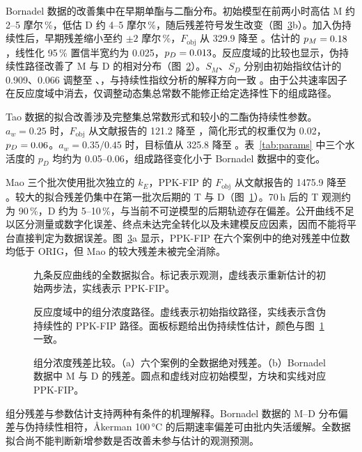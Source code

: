 Bornadel 数据的改善集中在早期单酯与二酯分布。初始模型在前两小时高估 M 约 2--5 摩尔\,\%，低估 D 约 4--5 摩尔\,\%，随后残差符号发生改变（图~\ref{fig:resid}b）。加入伪持续性后，早期残差缩小至约 $\pm2$ 摩尔\,\%，$F_\mathrm{obj}$ 从 329.9 降至 \InBornFnew。估计的 $p_M=0.18$，线性化 95\,\% 置信半宽约为 0.025，$p_D=0.013$。反应度域的比较也显示，伪持续性路径改善了 M 与 D 的相对分布（图~\ref{fig:paths}）。$S_M$、$S_D$ 分别由初始指纹估计的 0.909、0.066 调整至 \BornSM、\BornSD，与持续性指纹分析的解释方向一致 \cite{mitchell2023}。由于公共速率因子在反应度域中消去，仅调整动态集总常数不能修正给定选择性下的组成路径。

Tao 数据的拟合改善涉及完整集总常数形式和较小的二酯伪持续性参数。$a_w=0.25$ 时，$F_\mathrm{obj}$ 从文献报告的 121.2 降至 \InTaoAFnew，简化形式的权重仅为 0.02，$p_D=0.06$。$a_w=0.35/0.45$ 时，目标值从 325.8 降至 \InTaoBFnew。表~\ref{tab:params} 中三个水活度的 $p_D$ 均约为 0.05--0.06，组成路径变化小于 Bornadel 数据中的变化。

Mao 三个批次使用批次独立的 $k_E$，PPK-FIP 的 $F_\mathrm{obj}$ 从文献报告的 1475.9 降至 \InMaoFnew。较大的拟合残差仍集中在第一批次后期的 T 与 D（图~\ref{fig:fits}）。70\,h 后的 T 观测约为 90\,\%，D 约为 5--10\,\%，与当前不可逆模型的后期轨迹存在偏差。公开曲线不足以区分测量或数字化误差、终点未达完全转化以及未建模反应因素，因而不能将平台直接判定为数据误差。图~\ref{fig:resid}a 显示，PPK-FIP 在六个案例中的绝对残差中位数均低于 ORIG，但 Mao 的较大残差未被完全消除。
\begin{figure}[!htbp]\centering{}\caption{九条反应曲线的全数据拟合。标记表示观测，虚线表示重新估计的初始两步法，实线表示 PPK-FIP。}\label{fig:fits}\end{figure}
\begin{figure}[!htbp]\centering{}\caption{反应度域中的组分浓度路径。虚线表示初始指纹路径，实线表示含伪持续性的 PPK-FIP 路径。面板标题给出伪持续性估计，颜色与图~\ref{fig:fits} 一致。}\label{fig:paths}\end{figure}
\begin{figure}[!htbp]\centering{}\caption{组分浓度残差比较。（a）六个案例的全数据绝对残差。（b）Bornadel 数据中 M 与 D 的残差。圆点和虚线对应初始模型，方块和实线对应 PPK-FIP。}\label{fig:resid}\end{figure}

组分残差与参数估计支持两种有条件的机理解释。Bornadel 数据的 M--D 分布偏差与伪持续性相符，Åkerman 100\,°C 的后期速率偏差可由批内失活缓解。全数据拟合尚不能判断新增参数是否改善未参与估计的观测预测。

